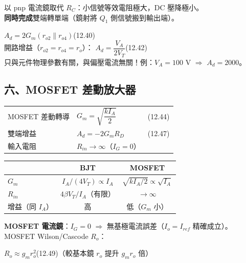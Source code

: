 \documentclass[10pt]{article}
\begin{document}
以 pnp 電流鏡取代 $R_C$：小信號等效電阻極大，DC 壓降極小。\\
\textbf{同時完成}雙端轉單端（鏡射將 $Q_1$ 側信號搬到輸出端）。

\begin{formulabox}
$A_d = 2G_m(r_{o2}\|r_{o4})$\hfill(12.40)\\[4pt]
開路增益（$r_{o2}=r_{o4}=r_o$）：\quad
$\boxed{A_d = \dfrac{V_A}{2V_T}}$\hfill(12.42)\\[3pt]
{\small 只與元件物理參數有關，與偏壓電流無關！例：$V_A=100$ V $\Rightarrow$ $A_d=2000$。}
\end{formulabox}

\subsection*{六、MOSFET 差動放大器}

\begin{formulabox}
\renewcommand{\arraystretch}{1.7}
\begin{tabular}{@{}p{4.2cm}@{\quad}l@{\qquad}l@{}}
MOSFET 差動轉導 & $G_m = \sqrt{\dfrac{kI_A}{2}}$ & (12.44) \\
雙端增益 & $A_d = -2G_m R_D$ & (12.47) \\
輸入電阻 & $R_{in} \to \infty$（$I_G=0$） & \\
\end{tabular}
\end{formulabox}

\renewcommand{\arraystretch}{1.2}
\begin{center}\small
\begin{tabular}{l c c}
\toprule
& \textbf{BJT} & \textbf{MOSFET} \\
\midrule
$G_m$ & $I_A/(4V_T) \propto I_A$ & $\sqrt{kI_A/2} \propto \sqrt{I_A}$ \\
$R_{in}$ & $4\beta V_T/I_A$（有限） & $\to \infty$ \\
增益（同 $I_A$） & 高 & 低（$G_m$ 小） \\
\bottomrule
\end{tabular}
\end{center}

\textbf{MOSFET 電流鏡}：$I_G=0$ $\Rightarrow$ 無基極電流誤差（$I_o = I_{ref}$ 精確成立）。\\
MOSFET Wilson/Cascode $R_o$：
\begin{formulabox}
$R_o \approx g_m r_o^2$\hfill(12.49)\qquad（較基本鏡 $r_o$ 提升 $g_m r_o$ 倍）
\end{formulabox}
\end{document}
